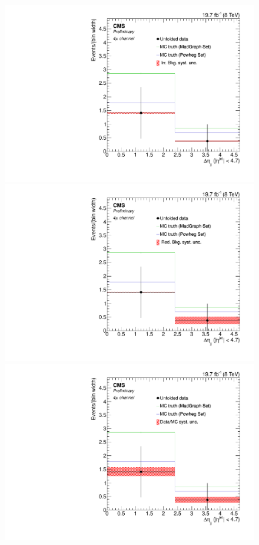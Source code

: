 \begin{figure}[hbtp]
\begin{center}
   \includegraphics[width=0.8\cmsFigWidth]{Figures/Unfolding/Systematics/ZZTo4m_Deta_IrrBkg_Mad_fr}
   \includegraphics[width=0.8\cmsFigWidth]{Figures/Unfolding/Systematics/ZZTo4m_Deta_RedBkg_Mad_fr}     
   \includegraphics[width=0.8\cmsFigWidth]{Figures/Unfolding/Systematics/ZZTo4m_Deta_UnfDataOverGenMC_Mad_fr}     

\end{center}
\end{figure}

